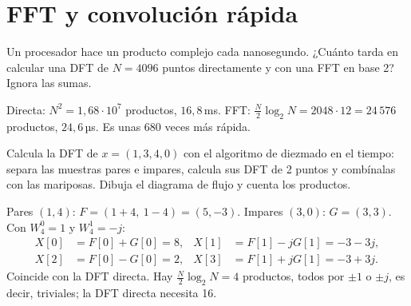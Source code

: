 \documentclass[11pt,a4paper]{scrartcl}
\begin{document}
\section*{FFT y convolución rápida}

\begin{ejercicio}
  Un procesador hace un producto complejo cada nanosegundo. ¿Cuánto tarda en calcular una DFT de $N=4096$ puntos directamente y con una FFT en base 2? Ignora las sumas.
\end{ejercicio}
\begin{solucion}
  Directa: $N^2=1{,}68\cdot10^7$ productos, $16{,}8$\,ms. FFT: $\frac N2\log_2N=2048\cdot12=24\,576$ productos, $24{,}6$\,µs. Es unas 680 veces más rápida.
\end{solucion}

\begin{ejercicio}
  Calcula la DFT de $x=(1,3,4,0)$ con el algoritmo de diezmado en el tiempo: separa las muestras pares e impares, calcula sus DFT de 2 puntos y combínalas con las mariposas. Dibuja el diagrama de flujo y cuenta los productos.
\end{ejercicio}
\begin{solucion}
  Pares $(1,4)$: $F=(1+4,\ 1-4)=(5,-3)$. Impares $(3,0)$: $G=(3,3)$. Con $W_4^0=1$ y $W_4^1=-j$:
  \begin{align*}
    X[0]&=F[0]+G[0]=8, & X[1]&=F[1]-jG[1]=-3-3j,\\
    X[2]&=F[0]-G[0]=2, & X[3]&=F[1]+jG[1]=-3+3j.
  \end{align*}
  Coincide con la DFT directa. Hay $\frac N2\log_2N=4$ productos, todos por $\pm1$ o $\pm j$, es decir, triviales; la DFT directa necesita 16.
\end{solucion}
\end{document}
